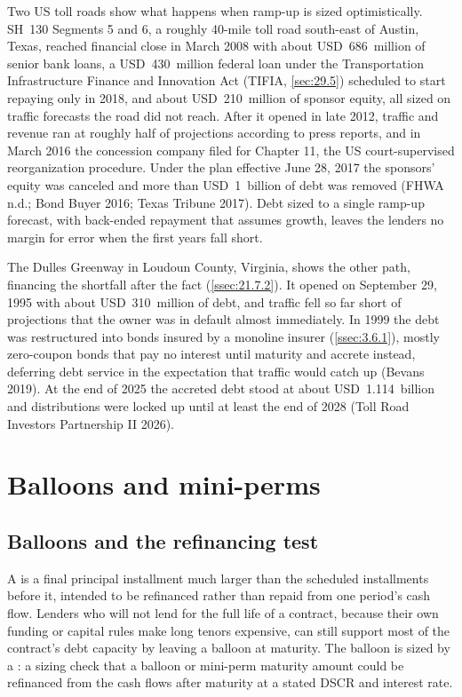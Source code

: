 Two US toll roads show what happens when ramp-up is sized optimistically. SH~130 Segments 5 and 6, a roughly 40-mile toll road south-east of Austin, Texas, reached financial close in March 2008 with about USD~686~million of senior bank loans, a USD~430~million federal loan under the Transportation Infrastructure Finance and Innovation Act (TIFIA, \cref{sec:29.5}) scheduled to start repaying only in 2018, and about USD~210~million of sponsor equity, all sized on traffic forecasts the road did not reach. After it opened in late 2012, traffic and revenue ran at roughly half of projections according to press reports, and in March 2016 the concession company filed for Chapter 11, the US court-supervised reorganization procedure. Under the plan effective June 28, 2017 the sponsors' equity was canceled and more than USD~1~billion of debt was removed (FHWA n.d.; Bond Buyer 2016; Texas Tribune 2017). Debt sized to a single ramp-up forecast, with back-ended repayment that assumes growth, leaves the lenders no margin for error when the first years fall short.

The Dulles Greenway in Loudoun County, Virginia, shows the other path, financing the shortfall after the fact (\cref{ssec:21.7.2}). It opened on September 29, 1995 with about USD~310~million of debt, and traffic fell so far short of projections that the owner was in default almost immediately. In 1999 the debt was restructured into bonds insured by a monoline insurer (\cref{ssec:3.6.1}), mostly zero-coupon bonds that pay no interest until maturity and accrete instead, deferring debt service in the expectation that traffic would catch up (Bevans 2019). At the end of 2025 the accreted debt stood at about USD~1.114~billion and distributions were locked up until at least the end of 2028 (Toll Road Investors Partnership II 2026).

\section{Balloons and mini-perms}\label{sec:36.7}

\subsection{Balloons and the refinancing test}\label{ssec:36.7.1}

A  is a final principal installment much larger than the scheduled installments before it, intended to be refinanced rather than repaid from one period's cash flow. Lenders who will not lend for the full life of a contract, because their own funding or capital rules make long tenors expensive, can still support most of the contract's debt capacity by leaving a balloon at maturity. The balloon is sized by a : a sizing check that a balloon or mini-perm maturity amount could be refinanced from the cash flows after maturity at a stated DSCR and interest rate.

